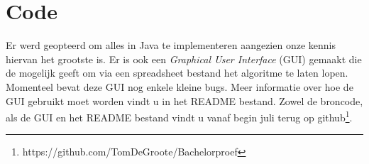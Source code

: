 \documentclass[Main.tex]{subfiles}
\begin{document}
\section{Code}
Er werd geopteerd om alles in Java te implementeren aangezien onze kennis hiervan het grootste is. Er is ook een \textit{Graphical User Interface} (GUI) gemaakt die de mogelijk geeft om via een spreadsheet bestand het algoritme te laten lopen. Momenteel bevat deze GUI nog enkele kleine bugs. Meer informatie over hoe de GUI gebruikt moet worden vindt u in het README bestand. Zowel de broncode, als de GUI en het README bestand vindt u vanaf begin juli terug op github\footnote{https://github.com/TomDeGroote/Bachelorproef}.
\end{document}
